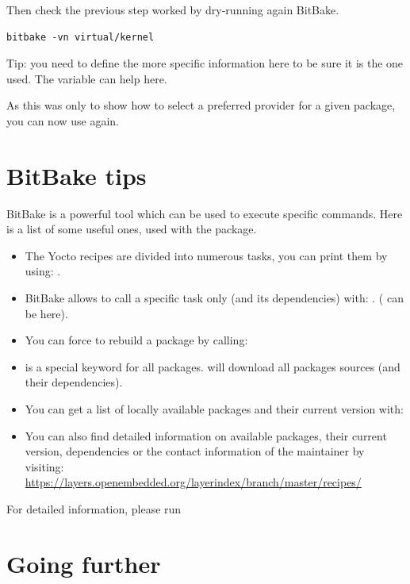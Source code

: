 Then check the previous step worked by dry-running again BitBake.
\begin{verbatim}
bitbake -vn virtual/kernel
\end{verbatim}

Tip: you need to define the more specific information here to be sure it is the
one used. The  variable can help here.

As this was only to show how to select a preferred provider for a
given package, you can now use  again.

\section{BitBake tips}

BitBake is a powerful tool which can be used to execute specific commands. Here
is a list of some useful ones, used with the  package.

\begin{itemize}
  \item The Yocto recipes are divided into numerous tasks, you can print them
        by using: .
  \item BitBake allows to call a specific task only (and its dependencies)
        with: . ( can be
         here).
  \item You can force to rebuild a package by calling: 
  \item {} is a special keyword for all packages.  will download all packages sources (and their
        dependencies).
  \item You can get a list of locally available packages and their current
        version with: \\
  \item You can also find detailed information on available packages, their
        current version, dependencies or the contact information of the
        maintainer by visiting: \\
        \url{https://layers.openembedded.org/layerindex/branch/master/recipes/}
\end{itemize}

For detailed information, please run 

\section{Going further}

